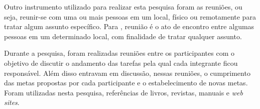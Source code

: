 	\par Outro instrumento utilizado para realizar esta pesquisa foram as
reuniões, ou seja, reunir-se com uma ou mais pessoas em um local, físico ou
remotamente para tratar algum assunto específico. Para
, reunião é o ato de encontro entre algumas pessoas em
um determinado local, com finalidade de tratar qualquer assunto.

	\par Durante a pesquisa, foram realizadas reuniões entre os participantes com
o objetivo de discutir o andamento das tarefas pela qual cada integrante ficou
responsável. Além disso entravam em discussão, nessas reuniões, o cumprimento
das metas propostas por cada participante e o estabelecimento de novas metas.
Foram utilizadas nesta pesquisa, referências de livros, revistas, manuais e
\textit{web sites}.